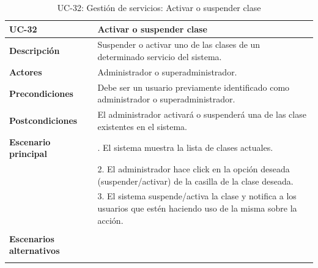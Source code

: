 \begin{table}
  \begin{center}
    \begin{tabularx}{16.4cm}{|l|X|}
      \hline
      \textbf{UC-32} & \textbf{Activar o suspender clase}\\
      \hline
      \textbf{Descripción} & Suspender o activar uno de las clases de un determinado servicio del sistema.\\
      \hline
      \textbf{Actores} & Administrador o superadministrador.\\
      \hline
      \textbf{Precondiciones} & Debe ser un usuario previamente identificado como administrador o superadministrador.\\
      \hline
      \textbf{Postcondiciones} & El administrador activará o suspenderá una de las clase existentes en el sistema.\\
      \hline
      \textbf{Escenario principal} & \smallskip 1. El sistema muestra la lista de clases actuales.\\
      & 2. El administrador hace click en la opción deseada (suspender/activar) de la casilla de la clase deseada.\\
      & 3. El sistema suspende/activa la clase y notifica a los usuarios que estén haciendo uso de la misma sobre la acción.\\
      & \\
      \hline
      \textbf{Escenarios alternativos} & \smallskip \\
      & \\
      \hline
    \end{tabularx}
    \caption{UC-32: Gestión de servicios: Activar o suspender clase}
    \label{tab:CU-activar-suspender-clase}
  \end{center}
\end{table}


